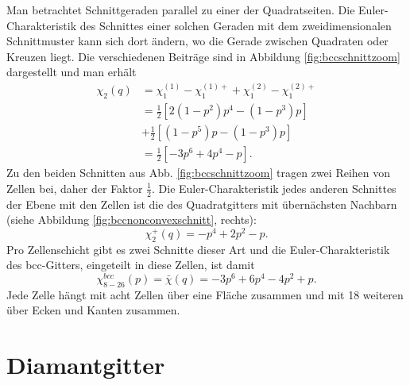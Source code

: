 Man betrachtet Schnittgeraden parallel zu einer der Quadratseiten. Die Euler-Charakteristik des Schnittes einer solchen Geraden mit dem zweidimensionalen Schnittmuster kann sich dort \"andern, wo die Gerade zwischen Quadraten oder Kreuzen liegt. Die verschiedenen Beitr\"age sind in Abbildung \ref{fig:bccschnittzoom} dargestellt und man erh\"alt 
\begin{equation}
\label{eq:bccschnitt}
  \begin{split}
    \chi_2(q) &=\chi_1^{(1)}-\chi_1^{(1)+}+\chi_1^{(2)}-\chi_1^{(2)+}\\
          &=\frac{1}{2} \left[ 2(1-p^2)p^4 - (1-p^3)p \right] \\
         &  + \frac{1}{2} \left[ (1-p^5)p - (1-p^3)p \right] \\
          & =  \frac{1}{2} \left[ -3p^6+4p^4-p \right].
\end{split}
\end{equation}
Zu den beiden Schnitten aus Abb. \ref{fig:bccschnittzoom} tragen zwei Reihen von Zellen bei, daher der Faktor $\frac{1}{2}$.
Die Euler-Charakteristik jedes anderen Schnittes der Ebene mit den Zellen ist die des Quadratgitters mit \"ubern\"achsten Nachbarn (siehe Abbildung \ref{fig:bccnonconvexschnitt}, rechts):
\begin{equation}
   \chi_2^+(q) =  -p^4+2p^2-p.
\end{equation}
Pro Zellenschicht gibt es zwei Schnitte dieser Art und die Euler-Charakteristik des bcc-Gitters, eingeteilt in diese Zellen, ist damit
        \begin{equation}
          \chi^{bcc}_{8-26}(p)=\bar{\chi}(q)=-3p^6+6p^4-4p^2+p.
        \end{equation}
Jede Zelle h\"angt mit acht Zellen \"uber eine Fl\"ache zusammen und mit 18 weiteren \"uber Ecken und Kanten zusammen.


\section{Diamantgitter}
\label{sec:appdiamant}
